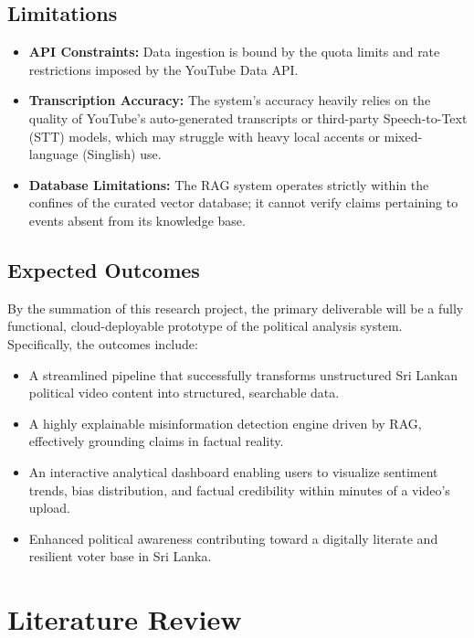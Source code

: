 \documentclass[12pt,a4paper]{report}
\begin{document}
\section{Limitations}
\begin{itemize}
    \item \textbf{API Constraints:} Data ingestion is bound by the quota limits and rate restrictions imposed by the YouTube Data API.
    \item \textbf{Transcription Accuracy:} The system’s accuracy heavily relies on the quality of YouTube's auto-generated transcripts or third-party Speech-to-Text (STT) models, which may struggle with heavy local accents or mixed-language (Singlish) use.
    \item \textbf{Database Limitations:} The RAG system operates strictly within the confines of the curated vector database; it cannot verify claims pertaining to events absent from its knowledge base.
\end{itemize}

\section{Expected Outcomes}
By the summation of this research project, the primary deliverable will be a fully functional, cloud-deployable prototype of the political analysis system. Specifically, the outcomes include:
\begin{itemize}
    \item A streamlined pipeline that successfully transforms unstructured Sri Lankan political video content into structured, searchable data.
    \item A highly explainable misinformation detection engine driven by RAG, effectively grounding claims in factual reality.
    \item An interactive analytical dashboard enabling users to visualize sentiment trends, bias distribution, and factual credibility within minutes of a video’s upload.
    \item Enhanced political awareness contributing toward a digitally literate and resilient voter base in Sri Lanka.
\end{itemize}

\chapter{Literature Review}
\end{document}
